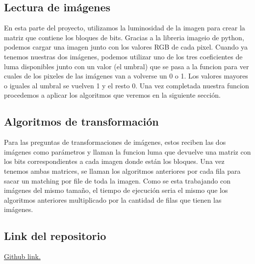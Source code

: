 \documentclass[12pt]{article}
\begin{document}
\subsection*{Lectura de imágenes}

\noindent En esta parte del proyecto, utilizamos la luminosidad de la imagen para crear la matriz que 
contiene los bloques de bits. Gracias a la libreria imageio de python, podemos cargar una imagen junto 
con los valores RGB de cada pixel. Cuando ya tenemos nuestras dos imágenes, podemos utilizar uno de los 
tres coeficientes de luma disponibles junto con un valor (el umbral) que se pasa a la funcion para ver cuales de los 
pixeles de las imágenes van a volverse un 0 o 1. Los valores mayores o iguales al umbral se vuelven 1 y el resto 0. 
Una vez completada nuestra funcion procedemos a aplicar los algoritmos que veremos en la siguiente sección.

\subsection*{Algoritmos de transformación}

\noindent Para las preguntas de transformaciones de imágenes, estos reciben las dos imágenes como 
parámetros y llaman la funcion luma que devuelve una matriz con los bits correspondientes a cada imagen 
donde están los bloques. Una vez tenemos ambas matrices, se llaman los algoritmos anteriores por cada fila 
para sacar un matching por file de toda la imagen. Como se esta trabajando con imágenes del mismo tamaño, 
el tiempo de ejecución seria el mismo que los algoritmos anteriores multiplicado por la cantidad de 
filas que tienen las imágenes.\\




\subsection*{Link del repositorio}
\noindent \href{https://www.github.com/DiegoELT/ADAProject}{Github link.}
\end{document}

